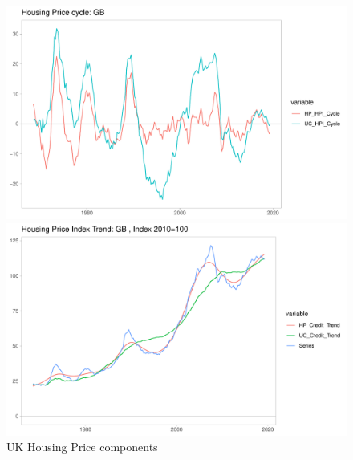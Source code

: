 \documentclass[fleqn]{article}
\begin{document}
\begin{outline}[enumerate]
\begin{figure}[h!]
	\caption{UK Housing Price components}	
	\centerline{\includegraphics[scale=0.7]{../Output/Graphs/HP_cycle_GB.pdf}}
	\centerline{\includegraphics[scale=0.7]{../Output/Graphs/HP_trend_GB.pdf}}
\end{figure}


\end{outline}
\end{document}
